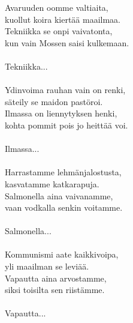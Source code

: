             Avaruuden oomme valtiaita, \\
            kuollut koira kiertää maailmaa. \\
            Tekniikka se onpi vaivatonta, \\
            kun vain Mossen saisi kulkemaan. \\
\hspace{10mm} \\
            Tekniikka... \\
\hspace{10mm} \\
            Ydinvoima rauhan vain on renki, \\
            säteily se maidon pastöroi. \\
            Ilmassa on liennytyksen henki, \\
            kohta pommit pois jo heittää voi. \\
\hspace{10mm} \\
            Ilmassa... \\
\hspace{10mm} \\
            Harrastamme lehmänjalostusta, \\
            kasvatamme katkarapuja. \\
            Salmonella aina vaivanamme, \\
            vaan vodkalla senkin voitamme. \\
\hspace{10mm} \\
            Salmonella... \\
\hspace{10mm} \\
            Kommunismi aate kaikkivoipa, \\
            yli maailman se leviää. \\
            Vapautta aina arvostamme, \\
            siksi toisilta sen riistämme. \\
\hspace{10mm} \\
            Vapautta... \\
